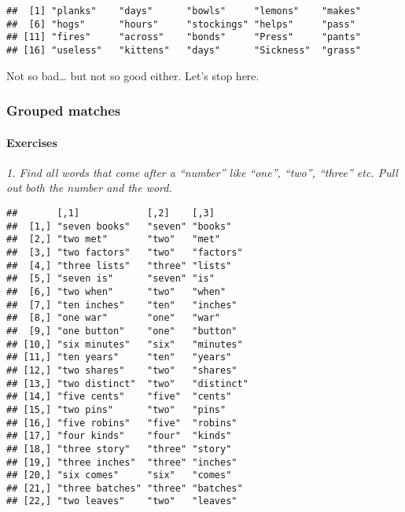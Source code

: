 \documentclass[]{article}
\newenvironment{Shaded}{\begin{snugshade}}{\end{snugshade}}
\newcommand{\KeywordTok}[1]{\textcolor[rgb]{0.13,0.29,0.53}{\textbf{#1}}}
\newcommand{\CharTok}[1]{\textcolor[rgb]{0.31,0.60,0.02}{#1}}
\newcommand{\StringTok}[1]{\textcolor[rgb]{0.31,0.60,0.02}{#1}}
\newcommand{\OperatorTok}[1]{\textcolor[rgb]{0.81,0.36,0.00}{\textbf{#1}}}
\newcommand{\NormalTok}[1]{#1}
\let\oldparagraph\paragraph
\renewcommand{\paragraph}[1]{\oldparagraph{#1}\mbox{}}
\theoremstyle{definition}
\theoremstyle{definition}
\theoremstyle{definition}
\theoremstyle{remark}
\begin{document}
\begin{verbatim}
##  [1] "planks"    "days"      "bowls"     "lemons"    "makes"    
##  [6] "hogs"      "hours"     "stockings" "helps"     "pass"     
## [11] "fires"     "across"    "bonds"     "Press"     "pants"    
## [16] "useless"   "kittens"   "days"      "Sickness"  "grass"
\end{verbatim}

Not so bad\ldots{} but not so good either. Let's stop here.

\subsubsection{Grouped matches}\label{grouped-matches}

\paragraph{Exercises}\label{exercises-33}

\emph{1. Find all words that come after a ``number'' like ``one'',
``two'', ``three'' etc. Pull out both the number and the word.}

\begin{Shaded}
\end{Shaded}

\begin{verbatim}
##       [,1]            [,2]    [,3]      
##  [1,] "seven books"   "seven" "books"   
##  [2,] "two met"       "two"   "met"     
##  [3,] "two factors"   "two"   "factors" 
##  [4,] "three lists"   "three" "lists"   
##  [5,] "seven is"      "seven" "is"      
##  [6,] "two when"      "two"   "when"    
##  [7,] "ten inches"    "ten"   "inches"  
##  [8,] "one war"       "one"   "war"     
##  [9,] "one button"    "one"   "button"  
## [10,] "six minutes"   "six"   "minutes" 
## [11,] "ten years"     "ten"   "years"   
## [12,] "two shares"    "two"   "shares"  
## [13,] "two distinct"  "two"   "distinct"
## [14,] "five cents"    "five"  "cents"   
## [15,] "two pins"      "two"   "pins"    
## [16,] "five robins"   "five"  "robins"  
## [17,] "four kinds"    "four"  "kinds"   
## [18,] "three story"   "three" "story"   
## [19,] "three inches"  "three" "inches"  
## [20,] "six comes"     "six"   "comes"   
## [21,] "three batches" "three" "batches" 
## [22,] "two leaves"    "two"   "leaves"
\end{verbatim}
\end{document}

